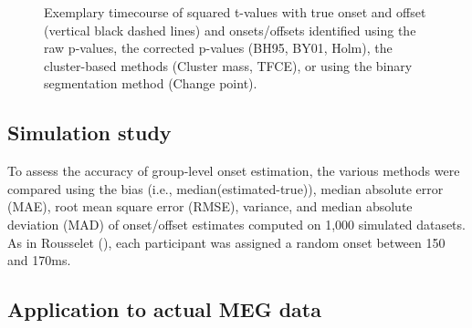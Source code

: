 \documentclass[
  man,
  floatsintext,
  longtable,
  a4paper,
  nolmodern,
  notxfonts,
  notimes,
  colorlinks=true,linkcolor=blue,citecolor=blue,urlcolor=blue]{apa7}
\begin{document}
\begin{figure}[!htb]

\caption{\label{fig-corrections}Exemplary timecourse of squared t-values
with true onset and offset (vertical black dashed lines) and
onsets/offsets identified using the raw p-values, the corrected p-values
(BH95, BY01, Holm), the cluster-based methods (Cluster mass, TFCE), or
using the binary segmentation method (Change point).}


\end{figure}%

\newpage

\subsection{Simulation study}\label{simulation-study}

To assess the accuracy of group-level onset estimation, the various
methods were compared using the bias (i.e., median(estimated-true)),
median absolute error (MAE), root mean square error (RMSE), variance,
and median absolute deviation (MAD) of onset/offset estimates computed
on 1,000 simulated datasets. As in Rousselet
(), each participant was
assigned a random onset between 150 and 170ms.

\subsection{Application to actual MEG
data}\label{application-to-actual-meg-data}
\end{document}
